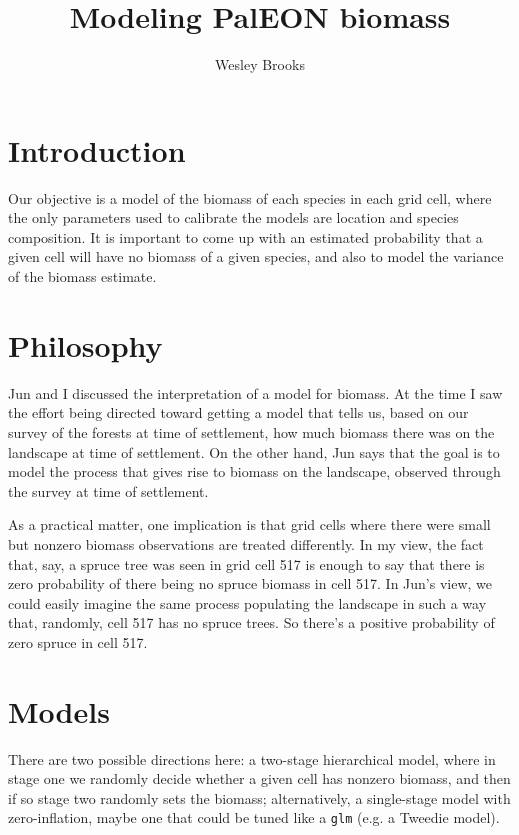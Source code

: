 \documentclass[authoryear, review, 11pt]{elsarticle}
\title{Modeling PalEON biomass}
\author{Wesley Brooks}
\date{}                                           %
\begin{document}
\maketitle


\section{Introduction}
Our objective is a  model of the biomass of each species in each grid cell, where the only parameters used to calibrate the models are location and species composition. It is important to come up with an estimated probability that a given cell will have no biomass of a given species, and also to model the variance of the biomass estimate.


\section{Philosophy}
Jun and I discussed the interpretation of a model for biomass. At the time I saw the effort being directed toward getting a model that tells us, based on our survey of the forests at time of settlement, how much biomass there was on the landscape at time of settlement. On the other hand, Jun says that the goal is to model the process that gives rise to biomass on the landscape, observed through the survey at time of settlement.

As a practical matter, one implication is that grid cells where there were small but nonzero biomass observations are treated differently. In my view, the fact that, say, a spruce tree was seen in grid cell 517 is enough to say that there is zero probability of there being no spruce biomass in cell 517. In Jun's view, we could easily imagine the same process populating the landscape in such a way that, randomly, cell 517 has no spruce trees. So there's a positive probability of zero spruce in cell 517.


\section{Models}
There are two possible directions here: a two-stage hierarchical model, where in stage one we randomly decide whether a given cell has nonzero biomass, and then if so stage two randomly sets the biomass; alternatively, a single-stage model with zero-inflation, maybe one that could be tuned like a \verb!glm! (e.g. a Tweedie model).\\
\end{document}
